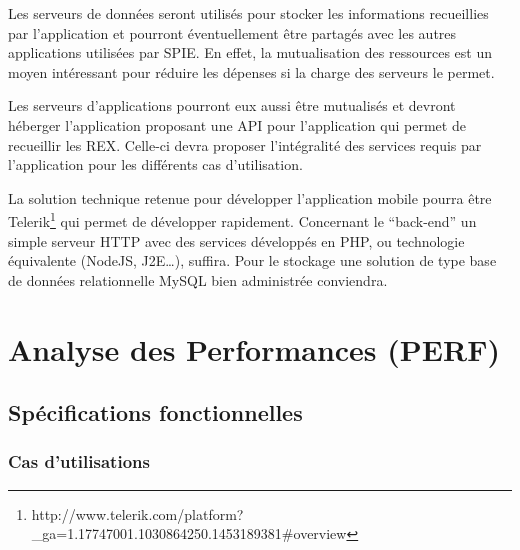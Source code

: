 Les serveurs de données seront utilisés pour stocker les informations recueillies par l’application et pourront éventuellement être partagés avec les autres applications utilisées par SPIE. En effet, la mutualisation des ressources est un moyen intéressant pour réduire les dépenses si la charge des serveurs le permet.

Les serveurs d’applications pourront eux aussi être mutualisés et devront héberger l’application proposant une API pour l’application qui permet de recueillir les REX. Celle-ci devra proposer l’intégralité des services requis par l’application pour les différents cas d’utilisation.

La solution technique retenue pour développer l’application mobile pourra être Telerik\footnote{http://www.telerik.com/platform?\_ga=1.17747001.1030864250.1453189381\#overview} qui permet de développer rapidement. Concernant le “back-end” un simple serveur HTTP avec des services développés en PHP, ou technologie équivalente (NodeJS, J2E…), suffira. Pour le stockage une solution de type base de données relationnelle MySQL bien administrée conviendra.

\section{Analyse des Performances (PERF)}%

\subsection{Spécifications fonctionnelles}

\subsubsection{Cas d’utilisations}

